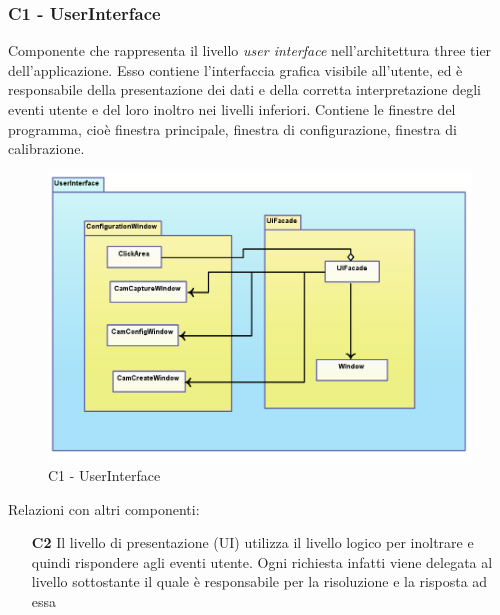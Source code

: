 \subsubsection{C1 - UserInterface} \label{sec:c1}
Componente che rappresenta il livello \textit{user interface} nell'architettura three tier dell'applicazione. Esso contiene l'interfaccia grafica visibile all'utente, ed è responsabile della presentazione dei dati e della corretta interpretazione degli eventi utente e del loro inoltro nei livelli inferiori. Contiene le finestre del programma, cioè finestra principale, finestra di configurazione, finestra di calibrazione. \\
\begin{figure}[!h] 

        \centering 

        \includegraphics[scale=0.4]{./images/c1.png} 

        \caption{C1 - UserInterface} 

        \label{fig:c1}

        \end{figure} 

Relazioni con altri componenti: 
\begin{itemize} 
\item [\textbf{C2}]
Il livello di presentazione (UI) utilizza il livello logico per inoltrare e quindi rispondere agli eventi utente. Ogni richiesta infatti viene delegata al livello sottostante il quale è responsabile per la risoluzione e la risposta ad essa 
\end{itemize} 

